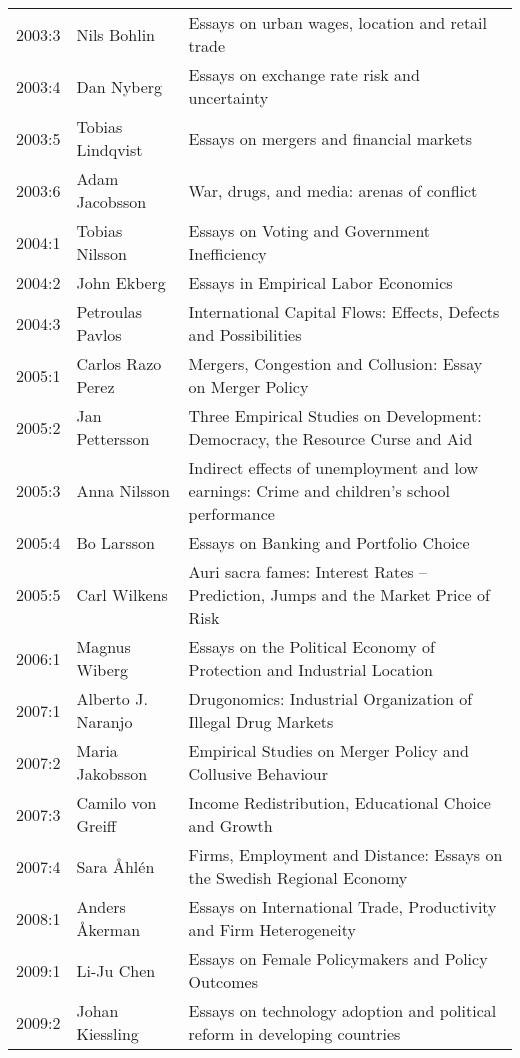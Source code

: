 {\begin{longtable}{p{} p{} p{}}
    2003:3 & Nils Bohlin & Essays on urban wages, location and retail trade \\
    2003:4 & Dan Nyberg & Essays on exchange rate risk and uncertainty \\
    2003:5 & Tobias Lindqvist & Essays on mergers and financial markets \\
    2003:6 & Adam Jacobsson & War, drugs, and media: arenas of conflict \\
    2004:1 & Tobias Nilsson & Essays on Voting and Government Inefficiency \\
    2004:2 & John Ekberg & Essays in Empirical Labor Economics \\
    2004:3 & Petroulas Pavlos & International Capital Flows: Effects, Defects and Possibilities \\
    2005:1 & Carlos Razo Perez & Mergers, Congestion and Collusion: Essay on Merger Policy \\
    2005:2 & Jan Pettersson & Three Empirical Studies on Development: Democracy, the Resource Curse and Aid \\
    2005:3 & Anna Nilsson & Indirect effects of unemployment and low earnings: Crime and children's school performance \\
    2005:4 & Bo Larsson & Essays on Banking and Portfolio Choice \\
    2005:5 & Carl Wilkens & Auri sacra fames: Interest Rates -- Prediction, Jumps and the Market Price of Risk \\
    2006:1 & Magnus Wiberg & Essays on the Political Economy of Protection and Industrial Location \\
    2007:1 & Alberto J. Naranjo & Drugonomics: Industrial Organization of Illegal Drug Markets \\
    2007:2 & Maria Jakobsson & Empirical Studies on Merger Policy and Collusive Behaviour \\
    2007:3 & Camilo von Greiff & Income Redistribution, Educational Choice and Growth \\
    2007:4 & Sara Åhlén & Firms, Employment and Distance: Essays on the Swedish Regional Economy \\
    2008:1 & Anders Åkerman & Essays on International Trade, Productivity and Firm Heterogeneity \\
    2009:1 & Li-Ju Chen & Essays on Female Policymakers and Policy Outcomes \\
    2009:2 & Johan Kiessling & Essays on technology adoption and political reform in developing countries \\

\end{longtable}}
